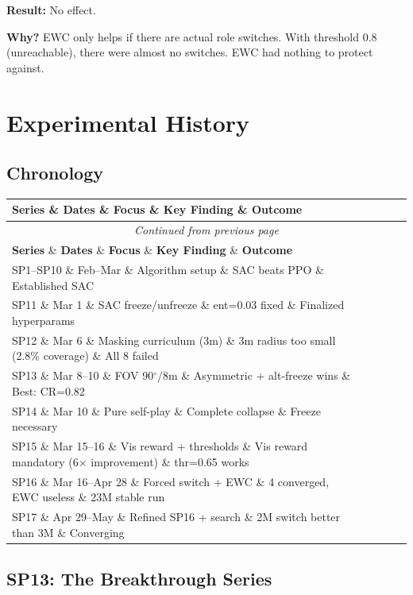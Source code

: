 \documentclass[11pt,a4paper]{report}
\begin{document}
\textbf{Result:} No effect.

\textbf{Why?} EWC only helps if there are actual role switches. With threshold 0.8 (unreachable), there were almost no switches. EWC had nothing to protect against.

\chapter{Experimental History}
\label{chap:experiments}

\section{Chronology}

\begin{longtable}{@{}llllp{4cm}@{}}
\toprule
\textbf{Series} \& \textbf{Dates} \& \textbf{Focus} \& \textbf{Key Finding} \& \textbf{Outcome} \\
\midrule
\endfirsthead
\multicolumn{5}{c}{\textit{Continued from previous page}} \\
\toprule
\textbf{Series} \& \textbf{Dates} \& \textbf{Focus} \& \textbf{Key Finding} \& \textbf{Outcome} \\
\midrule
\endhead
\bottomrule
\endfoot
SP1--SP10 \& Feb--Mar \& Algorithm setup \& SAC beats PPO \& Established SAC \\
SP11 \& Mar 1 \& SAC freeze/unfreeze \& ent=0.03 fixed \& Finalized hyperparams \\
SP12 \& Mar 6 \& Masking curriculum (3m) \& 3m radius too small (2.8\% coverage) \& All 8 failed \\
SP13 \& Mar 8--10 \& FOV 90$^\circ$/8m \& Asymmetric + alt-freeze wins \& Best: CR=0.82 \\
SP14 \& Mar 10 \& Pure self-play \& Complete collapse \& Freeze necessary \\
SP15 \& Mar 15--16 \& Vis reward + thresholds \& Vis reward mandatory (6$\times$ improvement) \& thr=0.65 works \\
SP16 \& Mar 16--Apr 28 \& Forced switch + EWC \& 4 converged, EWC useless \& 23M stable run \\
SP17 \& Apr 29--May \& Refined SP16 + search \& 2M switch better than 3M \& Converging \\
\bottomrule
\end{longtable}

\section{SP13: The Breakthrough Series}
\end{document}
